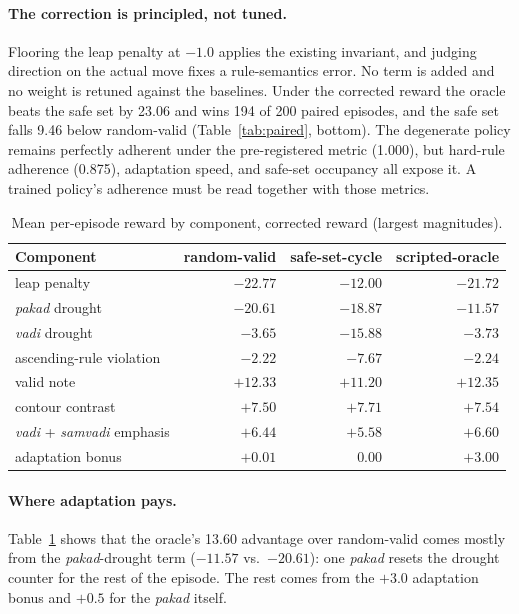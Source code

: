 \documentclass[11pt]{article}
\newcommand{\sw}[1]{\textit{#1}}  %
\begin{document}
\paragraph{The correction is principled, not tuned.} Flooring the leap penalty at $-1.0$ applies the existing invariant, and judging direction on the actual move fixes a rule-semantics error. No term is added and no weight is retuned against the baselines. Under the corrected reward the oracle beats the safe set by 23.06 and wins 194 of 200 paired episodes, and the safe set falls 9.46 below random-valid (Table~\ref{tab:paired}, bottom). The degenerate policy remains perfectly adherent under the pre-registered metric (1.000), but hard-rule adherence (0.875), adaptation speed, and safe-set occupancy all expose it. A trained policy's adherence must be read together with those metrics.

\begin{table}[t]
\centering\small
\caption{Mean per-episode reward by component, corrected reward (largest magnitudes).}
\label{tab:decomp}
\begin{tabular}{@{}lrrr@{}}
\toprule
Component & random-valid & safe-set-cycle & scripted-oracle \\
\midrule
leap penalty            & $-22.77$ & $-12.00$ & $-21.72$ \\
\sw{pakad} drought      & $-20.61$ & $-18.87$ & $-11.57$ \\
\sw{vadi} drought       & $-3.65$  & $-15.88$ & $-3.73$ \\
ascending-rule violation & $-2.22$ & $-7.67$  & $-2.24$ \\
valid note              & $+12.33$ & $+11.20$ & $+12.35$ \\
contour contrast        & $+7.50$  & $+7.71$  & $+7.54$ \\
\sw{vadi} + \sw{samvadi} emphasis & $+6.44$ & $+5.58$ & $+6.60$ \\
adaptation bonus        & $+0.01$  & $0.00$   & $+3.00$ \\
\bottomrule
\end{tabular}
\end{table}

\paragraph{Where adaptation pays.} Table~\ref{tab:decomp} shows that the oracle's 13.60 advantage over random-valid comes mostly from the \sw{pakad}-drought term ($-11.57$ vs.\ $-20.61$): one \sw{pakad} resets the drought counter for the rest of the episode. The rest comes from the $+3.0$ adaptation bonus and $+0.5$ for the \sw{pakad} itself.
\end{document}
